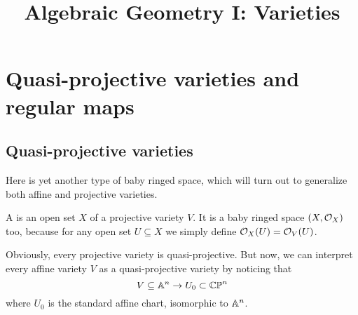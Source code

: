 \documentclass[11pt]{scrreprt}
\begin{document}
\title{Algebraic Geometry I: Varieties}
\maketitle

\tableofcontents

\chapter{Quasi-projective varieties and regular maps}
\section{Quasi-projective varieties}
Here is yet another type of baby ringed space,
which will turn out to generalize both affine and projective varieties.
\begin{definition}
	A  is
	an open set $X$ of a projective variety $V$.
	It is a baby ringed space $(X, \mathcal O_X)$ too,
	because for any open set $U \subseteq X$
	we simply define $\mathcal O_X(U) = \mathcal O_V(U)$.
\end{definition}
Obviously, every projective variety is quasi-projective.
But now, we can interpret every affine variety $V$
as a quasi-projective variety by noticing that
\[ V \subseteq \mathbb A^n \to U_0 \subset \mathbb{CP}^n \]
where $U_0$ is the standard affine chart, isomorphic to $\mathbb A^n$.
\end{document}
